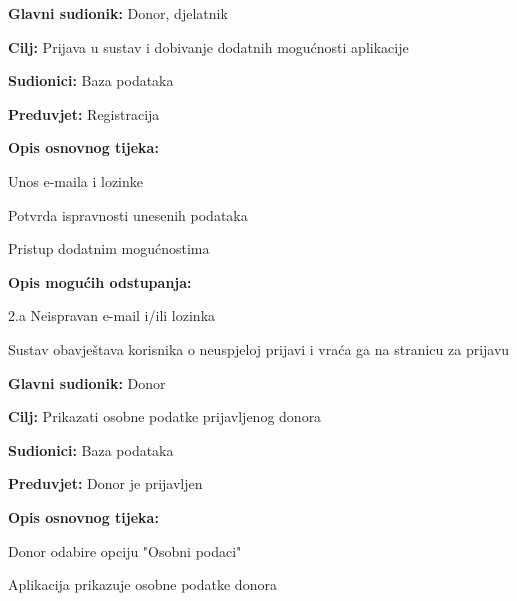 \documentclass[11pt]{book}
\begin{document}
\noindent {}
					\begin{packed_item}
	
						\item \textbf{Glavni sudionik: }Donor, djelatnik
						\item \textbf{Cilj:} Prijava u sustav i dobivanje dodatnih mogućnosti aplikacije
						\item \textbf{Sudionici:} Baza podataka
						\item \textbf{Preduvjet:} Registracija
						\item \textbf{Opis osnovnog tijeka:}
						
						\item[] \begin{packed_enum}
	
							\item Unos e-maila i lozinke
							\item Potvrda ispravnosti unesenih podataka
							\item Pristup dodatnim mogućnostima
							
						\end{packed_enum}
						\item  \textbf{Opis mogućih odstupanja:}
						
						\item[] \begin{packed_item}
	
							\item[2.a] Neispravan e-mail i/ili lozinka
							\item[] \begin{packed_enum}
								
								\item  Sustav obavještava korisnika o neuspjeloj prijavi i vraća ga na stranicu za prijavu

								
							\end{packed_enum}
					\end{packed_item}
					\end{packed_item}
\noindent {}
					\begin{packed_item}
	
						\item \textbf{Glavni sudionik: }Donor
						\item \textbf{Cilj:} Prikazati osobne podatke prijavljenog donora
						\item \textbf{Sudionici:} Baza podataka
						\item \textbf{Preduvjet:} Donor je prijavljen
						\item \textbf{Opis osnovnog tijeka:}
						
						\item[] \begin{packed_enum}
	
							\item Donor odabire opciju "Osobni podaci"
							\item Aplikacija prikazuje osobne podatke donora
							
						\end{packed_enum}

					\end{packed_item}
\end{document}

